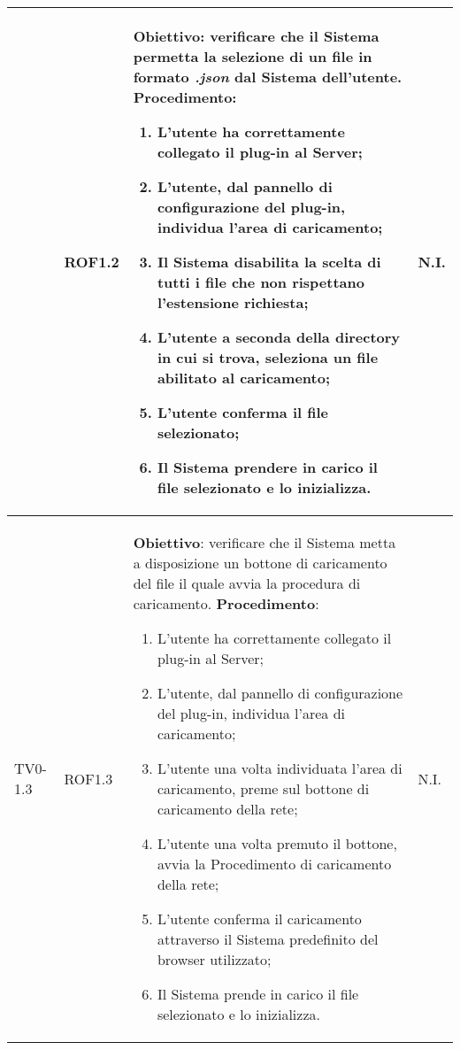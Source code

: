 \begin{longtable}{|C{.15\textwidth}|C{.13\textwidth}|m{.65\textwidth}|C{.08\textwidth}|}
   & ROF1.2 &
	\textbf{Obiettivo}: verificare che il Sistema permetta la selezione di un file in formato \textit{.json} dal Sistema dell'utente.\newline
	\textbf{Procedimento}:
	\begin{enumerate}
		\item L'utente ha correttamente collegato il plug-in al Server;
		\item L'utente, dal pannello di configurazione del plug-in, individua l'area di caricamento;
		\item Il Sistema disabilita la scelta di tutti i file che non rispettano l'estensione richiesta;
		\item L'utente a seconda della directory in cui si trova, seleziona un file abilitato al caricamento;
		\item L'utente conferma il file selezionato;
		\item Il Sistema prendere in carico il file selezionato e lo inizializza.
	\end{enumerate}
	& N.I. \\
\hline

 TV0-1.3 & ROF1.3 &
	\textbf{Obiettivo}: verificare che il Sistema metta a disposizione un bottone di caricamento del file il quale avvia la procedura di caricamento. \newline
	\textbf{Procedimento}:
	\begin{enumerate}
		\item L'utente ha correttamente collegato il plug-in al Server;
		\item L'utente, dal pannello di configurazione del plug-in, individua l'area di caricamento;
		\item L'utente una volta individuata l'area di caricamento, preme sul bottone di caricamento della rete;
		\item L'utente una volta premuto il bottone, avvia la Procedimento di caricamento della rete;
		\item L'utente conferma il caricamento attraverso il Sistema predefinito del browser utilizzato;
		\item Il Sistema prende in carico il file selezionato e lo inizializza.
	\end{enumerate}
	& N.I. \\
\hline


\end{longtable}
